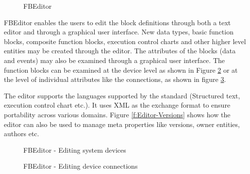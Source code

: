 %
\begin{figure}
\begin{center}
\caption[FBEditor]{FBEditor{\protect ~\cite{c:fun:2002}}}
\label{f:FBEditor}
\end{center}
\end{figure}
%

FBEditor enables the users to edit the block definitions through
both a text editor and through a graphical user interface. New
data types, basic function blocks, composite function blocks,
execution control charts and other higher level entities may be
created through the editor. The attributes of the blocks (data and
events) may also be examined through a graphical user interface.
The function blocks can be examined at the device level as shown
in Figure \ref{f:Editor-Devices} or at the level of individual
attributes like the connections, as shown in figure
\ref{f:Editor-Mapping}.

The editor supports the languages supported by the standard
(Structured text, execution control chart etc.). It uses XML as
the exchange format to ensure portability across various domains.
Figure \ref{f:Editor-Versions} shows how the editor can also be
used to manage meta properties like versions, owner entities,
authors etc.

%
\begin{figure}
\begin{center}
 \caption[FBEditor
- Editing system devices]{FBEditor - Editing system
devices{\protect ~\cite{c:fun:2002}}} \label{f:Editor-Devices}
\end{center}
\end{figure}
%

%
\begin{figure}
\begin{center}
 \caption[FBEditor
- Editing device connections]{FBEditor - Editing device
connections{\protect ~\cite{c:fun:2002}}} \label{f:Editor-Mapping}
\end{center}
\end{figure}
%

